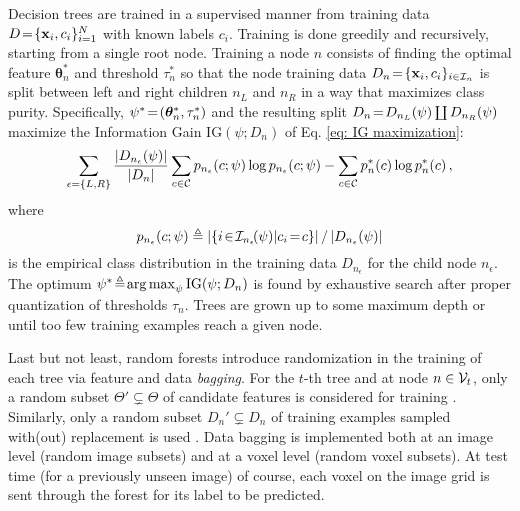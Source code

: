 Decision trees are trained in a supervised manner from training data $D\!=\!\{\boldsymbol{\mathrm{x}}_i,c_i\}_{i=1}^N$ with known labels $c_i$. Training is done greedily and recursively, starting from a single root node. Training a node $n$ consists of finding the optimal feature $\bm{\theta}_n^\ast$ and threshold $\tau_n^\ast$ so that the node training data $D_n\!=\!\{\boldsymbol{\mathrm{x}}_i,c_i\}_{i\in\mathcal{I}_n}$ is split between left and right children $n_L$ and $n_R$ in a way that maximizes class purity. Specifically, $\psi^\ast\!=\!(\bm{\theta}_n^\ast, \tau_n^\ast)$ and the resulting split $D_n\!=\! D_{n_L}(\psi)\coprod D_{n_R}(\psi)$ maximize the Information Gain $\text{IG}(\psi; D_n)$ of Eq. \eqref{eq: IG maximization}:
\begin{equation}
\sum_{\epsilon=\{L,R\}} \frac{\vert D_{n_\epsilon}(\psi)\vert}{\vert D_n\vert}\sum_{c\in\mathcal{C}}p_{n_\epsilon}(c;\psi)\log{p_{n_\epsilon}(c;\psi)} \\ 
 -\sum_{c\in\mathcal{C}}p_{n}^\ast(c)\log{p_{n}^\ast(c)}\, ,
\label{eq: IG maximization}
\end{equation}
where
\begin{equation}
p_{n_\epsilon}(c;\psi)\triangleq\left\vert\{i\!\in\!\mathcal{I}_{n_\epsilon}\!(\psi)\vert c_i\!=\! c\}\right\vert/\left\vert D_{n_\epsilon}(\psi)\right\vert
\end{equation}
is the empirical class distribution in the training data $D_{n_\epsilon}$ for the child node $n_\epsilon$. The optimum $\psi^\ast\!\triangleq\! \operatorname*{arg\,max}_{\psi}\text{IG}(\psi; D_n)$ is found by exhaustive search after proper quantization of thresholds $\tau_n$. Trees are grown up to some maximum depth or until too few training examples reach a given node.

Last but not least, random forests introduce randomization in the training of each tree via feature and data \textit{bagging}. For the $t$-th tree and at node $n\in\mathcal{V}_t$, only a random subset $\Theta' \!\varsubsetneq\! \Theta$ of candidate features is considered for training \cite{amit1997shape,ho1998random}. %
Similarly, only a random subset $D_n'\!\varsubsetneq\!D_n$ of training examples sampled with(out) replacement is used \cite{breiman1996bagging}. %
Data bagging is implemented both at an image level (random image subsets) and at a voxel level (random voxel subsets). At test time (for a previously unseen image) of course, each voxel on the image grid is sent through the forest for its label to be predicted. 

